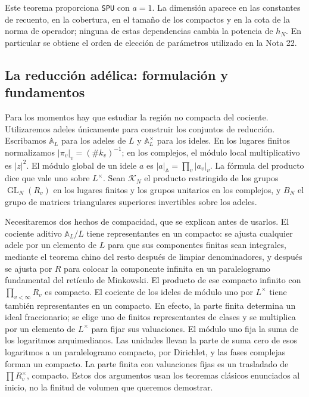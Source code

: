 Este teorema proporciona \texttt{SPU} con $a=1$. La dimensión aparece en las constantes de recuento, en la cobertura, en el tamaño de los compactos y en la cota de la norma de operador; ninguna de estas dependencias cambia la potencia de $h_N$. En particular se obtiene el orden de elección de parámetros utilizado en la Nota 22.

\subsection{La reducción adélica: formulación y fundamentos}

Para los momentos hay que estudiar la región no compacta del cociente. Utilizaremos adeles únicamente para construir los conjuntos de reducción. Escribamos $\mathbb A_L$ para los adeles de $L$ y $\mathbb A_L^\times$ para los ideles. En los lugares finitos normalizamos $|\pi_v|_v=(\#k_v)^{-1}$; en los complejos, el módulo local multiplicativo es $|z|^2$. El módulo global de un idele $a$ es $|a|_{\mathbb A}=\prod_v|a_v|_v$. La fórmula del producto dice que vale uno sobre $L^\times$. Sean $\mathcal K_N$ el producto restringido de los grupos $\operatorname{GL}_N(R_v)$ en los lugares finitos y los grupos unitarios en los complejos, y $B_N$ el grupo de matrices triangulares superiores invertibles sobre los adeles.

Necesitaremos dos hechos de compacidad, que se explican antes de usarlos. El cociente aditivo $\mathbb A_L/L$ tiene representantes en un compacto: se ajusta cualquier adele por un elemento de $L$ para que sus componentes finitas sean integrales, mediante el teorema chino del resto después de limpiar denominadores, y después se ajusta por $R$ para colocar la componente infinita en un paralelogramo fundamental del retículo de Minkowski. El producto de ese compacto infinito con $\prod_{v<\infty}R_v$ es compacto. El cociente de los ideles de módulo uno por $L^\times$ tiene también representantes en un compacto. En efecto, la parte finita determina un ideal fraccionario; se elige uno de finitos representantes de clases y se multiplica por un elemento de $L^\times$ para fijar sus valuaciones. El módulo uno fija la suma de los logaritmos arquimedianos. Las unidades llevan la parte de suma cero de esos logaritmos a un paralelogramo compacto, por Dirichlet, y las fases complejas forman un compacto. La parte finita con valuaciones fijas es un trasladado de $\prod R_v^\times$, compacto. Estos dos argumentos usan los teoremas clásicos enunciados al inicio, no la finitud de volumen que queremos demostrar.

